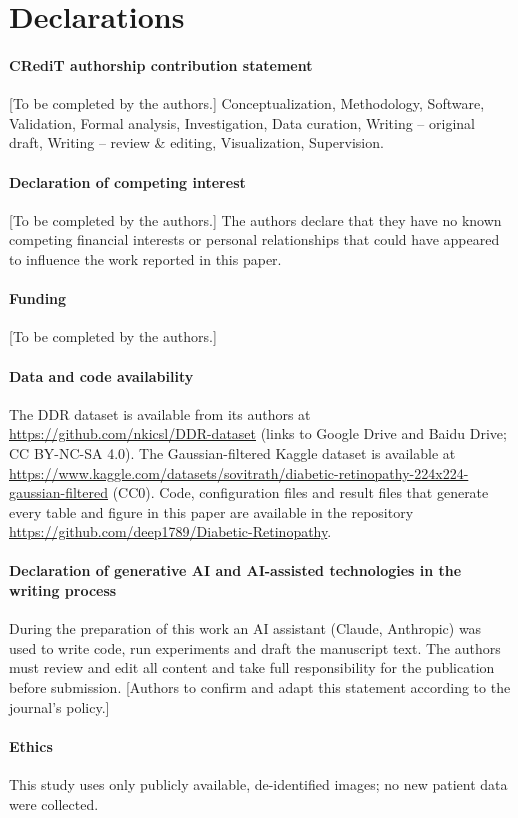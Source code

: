 \section*{Declarations}
\paragraph{CRediT authorship contribution statement} [To be completed by the authors.] Conceptualization, Methodology, Software, Validation, Formal analysis, Investigation, Data curation, Writing -- original draft, Writing -- review \& editing, Visualization, Supervision.

\paragraph{Declaration of competing interest} [To be completed by the authors.] The authors declare that they have no known competing financial interests or personal relationships that could have appeared to influence the work reported in this paper.

\paragraph{Funding} [To be completed by the authors.]

\paragraph{Data and code availability} The DDR dataset is available from its authors at \url{https://github.com/nkicsl/DDR-dataset} (links to Google Drive and Baidu Drive; CC BY-NC-SA 4.0). The Gaussian-filtered Kaggle dataset is available at \url{https://www.kaggle.com/datasets/sovitrath/diabetic-retinopathy-224x224-gaussian-filtered} (CC0). Code, configuration files and result files that generate every table and figure in this paper are available in the repository \url{https://github.com/deep1789/Diabetic-Retinopathy}.

\paragraph{Declaration of generative AI and AI-assisted technologies in the writing process} During the preparation of this work an AI assistant (Claude, Anthropic) was used to write code, run experiments and draft the manuscript text. The authors must review and edit all content and take full responsibility for the publication before submission. [Authors to confirm and adapt this statement according to the journal's policy.]

\paragraph{Ethics} This study uses only publicly available, de-identified images; no new patient data were collected.
